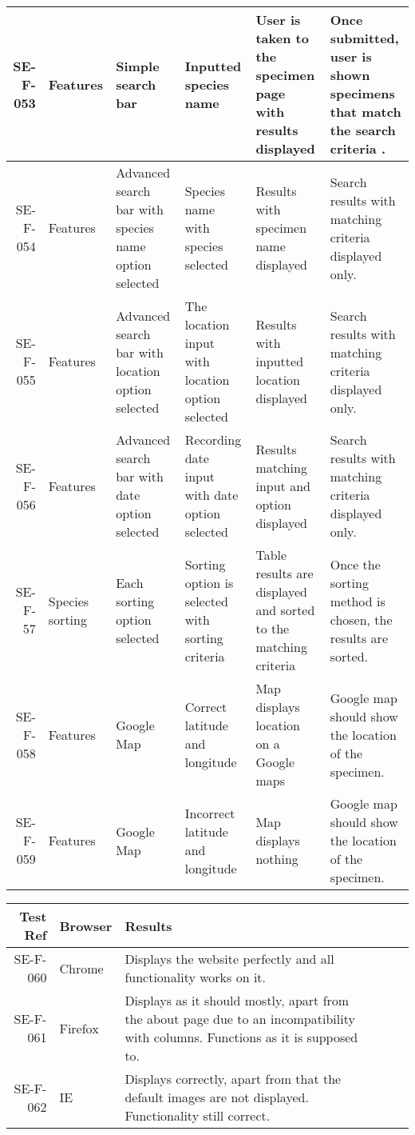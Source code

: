 \begin{landscape}
\begin{longtable}{|r|l|p{4cm}|p{4cm}|p{4cm}|p{4cm}|}
        SE-F-053 & Features & Simple search bar & Inputted species name & User is taken to the specimen page with results displayed & Once submitted, user is shown specimens that match the search criteria  . \\ \hline
        SE-F-054 & Features & Advanced search bar with species name option selected& Species name with species selected & Results with specimen name displayed & Search results with matching criteria displayed only. \\ \hline
        SE-F-055 & Features & Advanced search bar with location option selected & The location input with location option selected & Results with inputted location displayed & Search results with matching criteria displayed only.\\ \hline
        SE-F-056 & Features & Advanced search bar with date option selected & Recording date input with date option selected & Results matching input and option displayed & Search results with matching criteria displayed only. \\ \hline
        SE-F-57 & Species sorting & Each sorting option selected & Sorting option is selected with sorting criteria & Table results are displayed and sorted to the matching criteria & Once the sorting method is chosen, the results are sorted. \\ \hline
        SE-F-058 & Features & Google Map & Correct latitude and  longitude & Map displays location on a Google maps & Google map should show the location of the specimen.\\ \hline
        SE-F-059 & Features & Google Map & Incorrect latitude and  longitude & Map displays nothing & Google map should show the location of the specimen. \\ \hline
        \end{longtable}

        \begin{longtable}{|r|l|p{4cm}|p{4cm}|p{4cm}|p{4cm}|}
            \hline
            Test Ref & Browser & Results\\ \hline
            SE-F-060 & Chrome & Displays the website perfectly and all functionality works on it.\\ \hline
            SE-F-061 & Firefox & Displays as it should mostly, apart from the about page due to an incompatibility with columns. Functions as it is supposed to. \\ \hline
            SE-F-062 & IE  & Displays correctly, apart from that the default images are not displayed. Functionality still correct. \\ \hline
            
        \end{longtable}
    \end{landscape}

